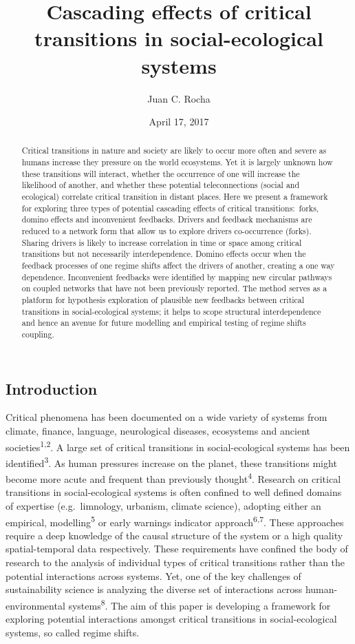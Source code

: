 \documentclass[9pt,]{article}
\title{Cascading effects of critical transitions in social-ecological systems}
\author{Juan C. Rocha}
\date{April 17, 2017}
\begin{document}
\maketitle
\begin{abstract}
Critical transitions in nature and society are likely to occur more
often and severe as humans increase they pressure on the world
ecosystems. Yet it is largely unknown how these transitions will
interact, whether the occurrence of one will increase the likelihood of
another, and whether these potential teleconnections (social and
ecological) correlate critical transition in distant places. Here we
present a framework for exploring three types of potential cascading
effects of critical transitions\(:\) forks, domino effects and
inconvenient feedbacks. Drivers and feedback mechanisms are reduced to a
network form that allow us to explore drivers co-occurrence (forks).
Sharing drivers is likely to increase correlation in time or space among
critical transitions but not necessarily interdependence. Domino effects
occur when the feedback processes of one regime shifts affect the
drivers of another, creating a one way dependence. Inconvenient
feedbacks were identified by mapping new circular pathways on coupled
networks that have not been previously reported. The method serves as a
platform for hypothesis exploration of plausible new feedbacks between
critical transitions in social-ecological systems; it helps to scope
structural interdependence and hence an avenue for future modelling and
empirical testing of regime shifts coupling.
\end{abstract}

\subsection{Introduction}\label{introduction}

Critical phenomena has been documented on a wide variety of systems from
climate, finance, language, neurological diseases, ecosystems and
ancient societies\textsuperscript{1,2}. A large set of critical
transitions in social-ecological systems has been
identified\textsuperscript{3}. As human pressures increase on the
planet, these transitions might become more acute and frequent than
previously thought\textsuperscript{4}. Research on critical transitions
in social-ecological systems is often confined to well defined domains
of expertise (e.g.~limnology, urbanism, climate science), adopting
either an empirical, modelling\textsuperscript{5} or early warnings
indicator approach\textsuperscript{6,7}. These approaches require a deep
knowledge of the causal structure of the system or a high quality
spatial-temporal data respectively. These requirements have confined the
body of research to the analysis of individual types of critical
transitions rather than the potential interactions across systems. Yet,
one of the key challenges of sustainability science is analyzing the
diverse set of interactions across human-environmental
systems\textsuperscript{8}. The aim of this paper is developing a
framework for exploring potential interactions amongst critical
transitions in social-ecological systems, so called regime shifts.
\end{document}
